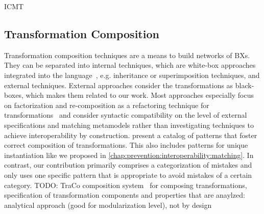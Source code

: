 \begin{copiedFrom}{ICMT}
\subsection*{Transformation Composition}
Transformation composition techniques are a means to build networks of \acp{BX}.
They can be separated into internal techniques, which are white-box approaches integrated into the language~\cite{wagelaar2008a, wagelaar2010a, wagelaar2011a}, e.g. inheritance or superimposition techniques, and external techniques.
External approaches consider the transformations as black-boxes, which makes them related to our work.
Most approaches especially focus on factorization and re-composition as a refactoring technique for transformations~\cite{cuadrado2008a} and consider syntactic compatibility on the level of external specifications and matching metamodels rather than investigating techniques to achieve interoperability by construction.
\textcite{lano2014a} present a catalog of patterns that foster correct composition of transformations.
This also includes patterns for unique instantiation like we proposed in \autoref{chap:prevention:interoperability:matching}.
In contrast, our contribution primarily comprises a categorization of mistakes %
and only uses one specific pattern that is appropriate to avoid mistakes of a certain category. %
TODO: TraCo composition system~\cite{heidenreich2010composition} for composing transformations, specification of transformation components and properties that are anaylzed: analytical approach (good for modularization level), not by design




\end{copiedFrom}
